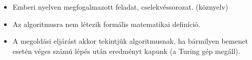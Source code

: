 \documentclass[11pt,a4paper]{article}
\begin{document}
            \begin{tcolorbox}[colback=blue!5!white,colframe=blue!50!black,title= 4. Ismertesse az algoritmus köznyelvi és matematikai és Turing-géppel megfogalmazott definícióját!]
                \begin{itemize}
                    \item Emberi nyelven megfogalmazott feladat, cselekvéssorozat. (köznyelv)
                    \item Az algoritmusra nem létezik formális matematikai definíció.
                    \item A megoldási eljárást akkor tekintjük algoritmusnak, ha bármilyen bemenet esetén véges számú lépés után eredményt kapunk (a Turing gép megáll).
                \end{itemize}
                \begin{center}
                \end{center}
            \end{tcolorbox}
\end{document}
